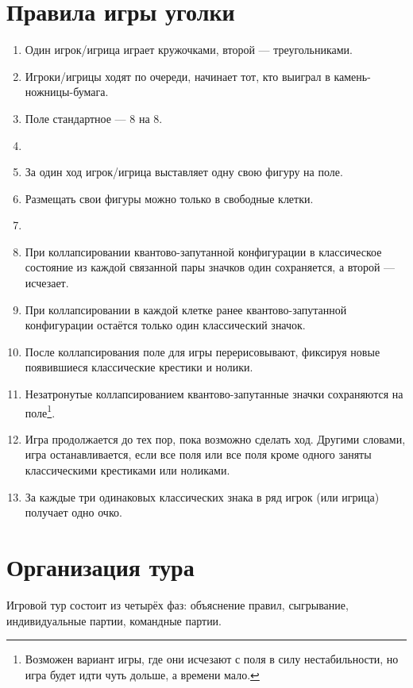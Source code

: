 \documentclass[11pt]{article} %
\begin{document}
\section*{Правила игры уголки}
\begin{enumerate}
    \item Один игрок/игрица играет кружочками, второй — треугольниками. 
    \item Игроки/игрицы ходят по очереди, начинает тот, кто выиграл в камень-ножницы-бумага. 
    \item Поле стандартное — 8 на 8. 
    \item 
    \item За один ход игрок/игрица выставляет одну свою фигуру на поле. 
    \item Размещать свои фигуры можно только в свободные клетки.
    \item 
    \item При коллапсировании квантово-запутанной конфигурации в классическое состояние из каждой связанной пары значков один сохраняется, а второй — исчезает.
    \item При коллапсировании в каждой клетке ранее квантово-запутанной конфигурации остаётся только один классический значок. 
    \item После коллапсирования поле для игры перерисовывают, фиксируя новые появившиеся классические крестики и нолики. 
    \item Незатронутые коллапсированием квантово-запутанные значки сохраняются на поле\footnote{Возможен вариант игры, 
    где они исчезают с поля в силу нестабильности, но игра будет идти чуть дольше, а времени мало.}. 
    \item Игра продолжается до тех пор, пока возможно сделать ход. 
    Другими словами, игра останавливается, если все поля или все поля кроме одного заняты классическими крестиками или ноликами.
    \item За каждые три одинаковых классических знака в ряд игрок (или игрица) получает одно очко. 
\end{enumerate}


\newpage
\section*{Организация тура}

Игровой тур состоит из четырёх фаз: объяснение правил, сыгрывание, индивидуальные партии, командные партии.
\end{document}
